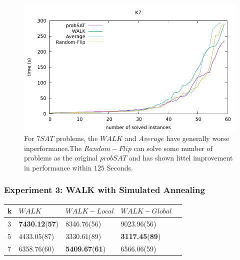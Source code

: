 \documentclass[12pt,a4paper,twoside]{scrartcl}
\numberwithin{equation}{section}
\begin{document}
  \begin{figure}[H]
\begin{center}
  \includegraphics[scale = 1]{DATA/K7/e2.pdf}
  \end{center}
  \caption{For $7SAT$ problems, the $WALK$ and $Average$ have generally worse inperformance.The $Random-Flip$ can solve some number of problems as the original $probSAT$ and has shown littel improvement in performance within $125$ Seconds.}
  \label{Experiment 2 k7 cactus plot}
  \end{figure}

\subsubsection{Experiment 3: WALK with Simulated Annealing} 
\label{sec:Experiment 3}
\begin{table}[H]
\begin{center}
    \begin{tabular}{|l|l|l|l|p{3cm}|}
\hline 

    k &$WALK$&$WALK-Local$&$WALK-Global$ \\ \hline      
    3 &\textbf{7430.12}(\textbf{57})&	8346.76(56)	&9023.96(56)  \\ \hline
    5&4433.05(87)	&3330.61(89)	&\textbf{3117.45}(\textbf{89}) \\ \hline
    7&6358.76(60)	&\textbf{5409.67}(\textbf{61})&	6566.06(59) \\ \hline	
\end{tabular}
\end{center}
\end{table} 
\end{document}
